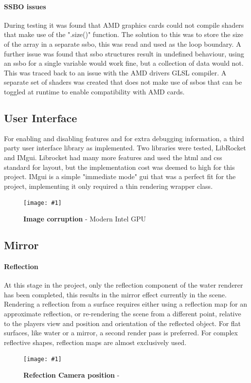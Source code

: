 \documentclass[conference]{acmsiggraph}
\newcommand{\figuremacroW}[4]{
	\begin{figure}[h] %
		\centering
		\texttt{[image: \#1]}
		\caption[#2]{\textbf{#2} - #3}
		\label{fig:#1}
	\end{figure}
}
\begin{document}
\paragraph{SSBO issues}
During testing it was found that AMD graphics cards could not compile shaders that make use of the ".size()" function. The solution to this was to store the size of the array in a separate ssbo, this was read and used as the loop boundary. A further issue was found that ssbo structures result in undefined behaviour, using an ssbo for a single variable would work fine, but a collection of data would not. This was traced back to an issue with the AMD drivers GLSL compiler. A separate set of shaders was created that does not make use of ssbos that can be toggled at runtime to enable compatibility with AMD cards.


\subsection{User Interface}
For enabling and disabling features and for extra debugging information, a third party user interface library as implemented. Two libraries were tested, LibRocket and IMgui. Librocket had many more features and used the html and css standard for layout, but the implementation cost was deemed to high for this project. IMgui is a simple "immediate mode" gui that was a perfect fit for the project, implementing it only required a thin rendering wrapper class.
\figuremacroW
{ui}
{Image corruption}
{Modern Intel GPU}
{1.0}

\subsection{Mirror}

\paragraph{Reflection}
At this stage in the project, only the reflection component of the water renderer has been completed, this results in the mirror effect currently in the scene. Rendering a reflection from a surface requires either using a reflection map for an approximate reflection, or re-rendering the scene from a different point, relative to the players view and position and orientation of the reflected object.
For flat surfaces, like water or a mirror, a second render pass is preferred. For complex reflective shapes, reflection maps are almost exclusively used.


\figuremacroW
{reflections}
{Refection Camera position}
{\protect\cite{Riemer}}
{1.0}
\end{document}
